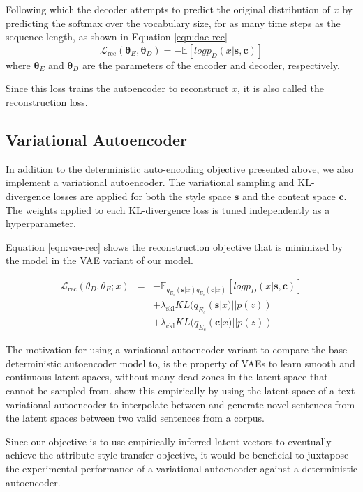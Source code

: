 Following which the decoder attempts to predict the original distribution of $x$ by predicting the softmax over the vocabulary size, for as many time steps as the sequence length, as shown in Equation \ref{eqn:dae-rec}
\begin{equation} \label{eqn:dae-rec}
	\mathcal{L}_\text{rec}(\bm\theta_E,\bm\theta_D)= -\mathbb{E}[log p_D(x|\bm s, \bm c)]
\end{equation}
where $\bm\theta_E$ and $\bm\theta_D$ are the parameters of the encoder and decoder, respectively.

Since this loss trains the autoencoder to reconstruct $x$, it is also called the reconstruction loss.


\subsection{Variational Autoencoder}

In addition to the deterministic auto-encoding objective presented above, we also implement a variational autoencoder. The variational sampling and KL-divergence losses are applied for both the style space $\bm s$ and the content space $\bm c$. The weights applied to each KL-divergence loss is tuned independently as a hyperparameter.

Equation \ref{eqn:vae-rec} shows the reconstruction objective that is minimized by the model in the VAE variant of our model.

\begin{eqnarray} \label{eqn:vae-rec}
	\mathcal{L}_\text{rec}(\theta_D, \theta_E; x) &=& \nonumber
	- \mathbb{E}_{q_{E_s}(\bm s|x) q_{E_c}(\bm c|x)} [log p_D(x|\bm s, \bm c)] \nonumber \\ & &
	+ \lambda_{\text{skl}} KL(q_{E_s}(\bm s|x)||p(z)) \nonumber \\ & &
	+ \lambda_{\text{ckl}} KL(q_{E_c}(\bm c|x)||p(z))
\end{eqnarray}

The motivation for using a variational autoencoder variant to compare the base deterministic autoencoder model to, is the property of VAEs to learn smooth and continuous latent spaces, without many dead zones in the latent space that cannot be sampled from. \cite{bowman2016generating} show this empirically by using the latent space of a text variational autoencoder to interpolate between and generate novel sentences from the latent spaces between two valid sentences from a corpus.

Since our objective is to use empirically inferred latent vectors to eventually achieve the attribute style transfer objective, it would be beneficial to juxtapose the experimental performance of a variational autoencoder against a deterministic autoencoder.


